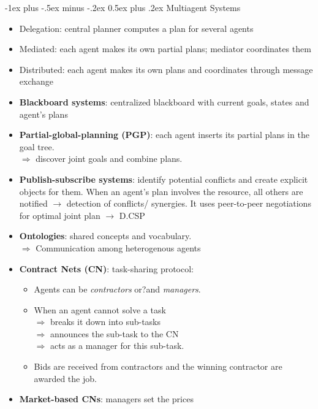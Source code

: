 \documentclass[10pt,a4paper,landscape]{article}
\makeatletter
\renewcommand{\section}{\@startsection{section}{1}{0mm}%
                                {-1ex plus -.5ex minus -.2ex}%
                                {0.5ex plus .2ex}%
                                {\normalfont\small\bfseries}}
\makeatother
\begin{document}
\begin{multicols*}{2}
\section{Multiagent Systems}
\begin{itemize}
	\item Delegation: central planner computes a plan for several agents
	\item Mediated: each agent makes its own partial plans; mediator coordinates them
	\item Distributed: each agent makes its own plans and coordinates through message exchange
	\item \textbf{Blackboard systems}: centralized blackboard with current goals, states and agent's plans
	\item \textbf{Partial-global-planning (PGP)}: each agent inserts its partial plans in the goal tree. \\
	$\Rightarrow$ discover joint goals and combine plans.
	\item \textbf{Publish-subscribe systems}: identify potential conflicts and create explicit objects for them. When an agent's plan involves the resource, all others are notified $\rightarrow$ detection of conflicts/ synergies. It uses peer-to-peer negotiations for optimal joint plan $\rightarrow$ D.CSP
	\item \textbf{Ontologies}: shared concepts and vocabulary.\\
	$\Rightarrow$ Communication among heterogenous agents

	\item \textbf{Contract Nets (CN)}: task-sharing protocol:
	\begin{itemize}
		\item Agents can be \textit{contractors} or?and \textit{managers}.
		\item When an agent cannot solve a task\\
		$\Rightarrow$ breaks it down into sub-tasks\\
		$\Rightarrow$ announces the sub-task to the CN \\
		$\Rightarrow$ acts as a manager for this sub-task.
		\item Bids are received from contractors and the winning contractor are awarded the job. 
	\end{itemize}

	\item \textbf{Market-based CNs}: managers set the prices
\end{itemize}


\end{multicols*}
\end{document}
